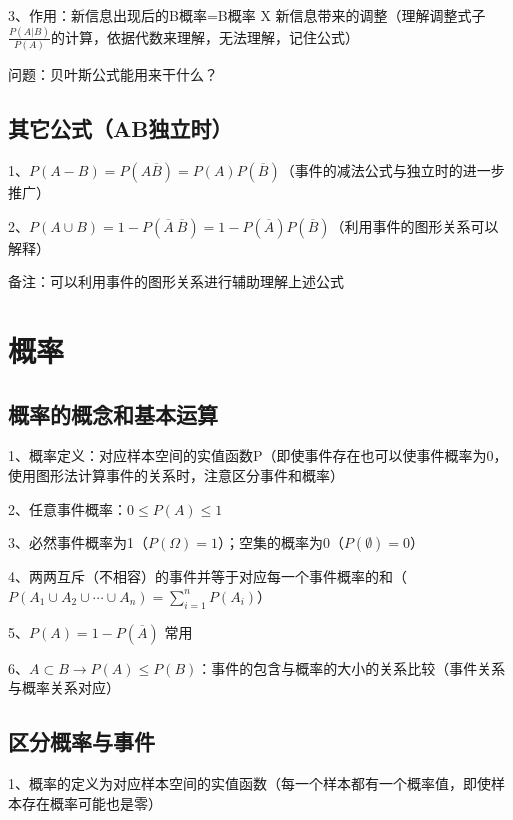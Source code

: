 3、作用：新信息出现后的B概率=B概率 X 新信息带来的调整（理解调整式子$\frac{P(A|B)}{P(A)}$的计算，依据代数来理解，无法理解，记住公式）

问题：贝叶斯公式能用来干什么？



\subsection{其它公式（AB独立时）}

1、$P(A-B) = P(A\overline B)=P(A)P(\overline B)$（事件的减法公式与独立时的进一步推广）

2、$P(A\cup B) = 1-P(\overline A \  \overline B) = 1-P(\overline A)P(  \overline B)$（利用事件的图形关系可以解释）



备注：可以利用事件的图形关系进行辅助理解上述公式

\section{概率}



\subsection{概率的概念和基本运算}

1、概率定义：对应样本空间的实值函数P（即使事件存在也可以使事件概率为0，使用图形法计算事件的关系时，注意区分事件和概率）

2、任意事件概率：$0 \leqslant P(A)\leqslant 1$

3、必然事件概率为1（$P(\Omega)=1$）；空集的概率为0（$P(\emptyset)=0$）

4、两两互斥（不相容）的事件并等于对应每一个事件概率的和（$P\left(A_{1} \cup A_{2} \cup \cdots \cup A_{n}\right)=\sum_{i=1}^{n} P\left(A_{i}\right)$）

5、$P(A)=1-P(\overline A)$ 常用

6、$A \subset B\rightarrow P(A) \leqslant P(B)$：事件的包含与概率的大小的关系比较（事件关系与概率关系对应）



\subsection{区分概率与事件}

1、概率的定义为对应样本空间的实值函数（每一个样本都有一个概率值，即使样本存在概率可能也是零）

